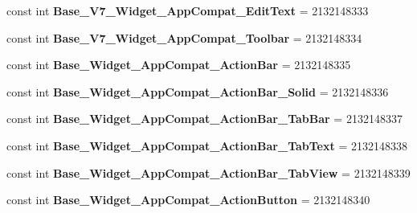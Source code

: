 \begin{DoxyCompactItemize}
\mbox{\label{classst_delivery_1_1_resource_1_1_style_a3b5b1436210577061c0ab2ec86cc6689}} 
const int {\bfseries Base\+\_\+\+V7\+\_\+\+Widget\+\_\+\+App\+Compat\+\_\+\+Edit\+Text} = 2132148333
\item 
\mbox{\label{classst_delivery_1_1_resource_1_1_style_afea82df200c5ee652ba7ba81e4cc5ebc}} 
const int {\bfseries Base\+\_\+\+V7\+\_\+\+Widget\+\_\+\+App\+Compat\+\_\+\+Toolbar} = 2132148334
\item 
\mbox{\label{classst_delivery_1_1_resource_1_1_style_a06bab28945633c206f32a2586c390932}} 
const int {\bfseries Base\+\_\+\+Widget\+\_\+\+App\+Compat\+\_\+\+Action\+Bar} = 2132148335
\item 
\mbox{\label{classst_delivery_1_1_resource_1_1_style_a1edf81705569dc8f2ca7bf3a84a9e5c4}} 
const int {\bfseries Base\+\_\+\+Widget\+\_\+\+App\+Compat\+\_\+\+Action\+Bar\+\_\+\+Solid} = 2132148336
\item 
\mbox{\label{classst_delivery_1_1_resource_1_1_style_a96241b9d20e64f76f54230f72f377498}} 
const int {\bfseries Base\+\_\+\+Widget\+\_\+\+App\+Compat\+\_\+\+Action\+Bar\+\_\+\+Tab\+Bar} = 2132148337
\item 
\mbox{\label{classst_delivery_1_1_resource_1_1_style_a56a35716f8c62763704c58965cd525c4}} 
const int {\bfseries Base\+\_\+\+Widget\+\_\+\+App\+Compat\+\_\+\+Action\+Bar\+\_\+\+Tab\+Text} = 2132148338
\item 
\mbox{\label{classst_delivery_1_1_resource_1_1_style_a755d8224e03a3a5d3455e38eb706dd38}} 
const int {\bfseries Base\+\_\+\+Widget\+\_\+\+App\+Compat\+\_\+\+Action\+Bar\+\_\+\+Tab\+View} = 2132148339
\item 
\mbox{\label{classst_delivery_1_1_resource_1_1_style_a647ea96fc8055badae7cb049ed3128b4}} 
const int {\bfseries Base\+\_\+\+Widget\+\_\+\+App\+Compat\+\_\+\+Action\+Button} = 2132148340
\item 

\end{DoxyCompactItemize}
